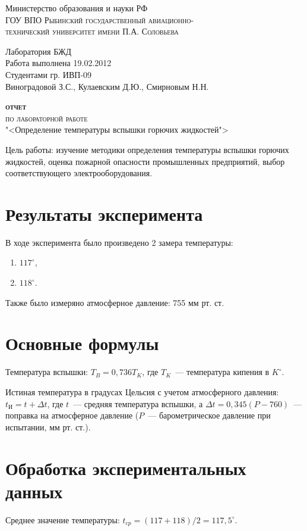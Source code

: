 		\begin{center}
			Министерство образования и науки РФ\\
			\textsc{ГОУ ВПО Рыбинский государственный авиационно-\\
			технический университет имени П.А. Соловьева}
		\end{center}
		\vspace{1em}
		\begin{center}
			Лаборатория БЖД\\
			Работа выполнена 19.02.2012\\
			Студентами гр. ИВП-09\\
			Виноградовой З.С., Кулаевским Д.Ю., Смирновым Н.Н.
		\end{center}
		\begin{center}
			\textsc{\bfseries отчет}\\
			\textsc{по лабораторной работе}\\
			"<Определение температуры вспышки горючих жидкостей">
		\end{center}

Цель работы: изучение методики определения температуры вспышки горючих жидкостей, оценка пожарной опасности промышленных предприятий, выбор соответствующего электрооборудования.

\section{Результаты эксперимента}
В ходе эксперимента было произведено 2 замера температуры:
\begin{enumerate}
	\item $117^{\circ}$,
	\item $118^{\circ}$.
\end{enumerate}
Также было измеряно атмосферное давление: 755 мм рт. ст.

\section{Основные формулы}
Температура вспышки: $T_B=0{,}736T_K$, где $T_K$~--- температура кипения в $K^{\circ}$.

Истиная температура в градусах Цельсия с учетом атмосферного давления: $t_{\text{И}}=t+\Delta{}t$, где $t$~--- средняя температура вспышки, а $\Delta{}t=0{,}345(P-760)$~--- поправка на атмосферное давление ($P$~--- барометрическое давление при испытании, мм рт. ст.).

\section{Обработка экспериментальных данных}
Среднее значение температуры: $t_{cp}=(117+118)/2=117{,}5^{\circ}$.

